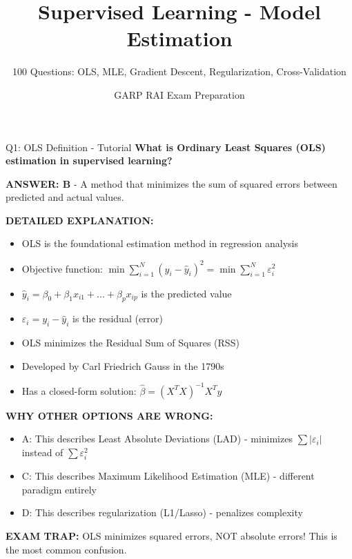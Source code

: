 \documentclass[8pt]{beamer}
\title{Supervised Learning - Model Estimation}
\subtitle{100 Questions: OLS, MLE, Gradient Descent, Regularization, Cross-Validation}
\author{GARP RAI Exam Preparation}
\date{}
\begin{document}
	
	\begin{frame}
		\titlepage
	\end{frame}
	
	
	\begin{frame}{Q1: OLS Definition - Tutorial}
		\fontsize{6.5}{7.5}\selectfont
		\textbf{What is Ordinary Least Squares (OLS) estimation in supervised learning?}
		
		\vspace{0.05cm}
		\textcolor{myblue}{\textbf{ANSWER: B}} - A method that minimizes the sum of squared errors between predicted and actual values.
		
		\vspace{0.05cm}
		\textbf{DETAILED EXPLANATION:}
		\begin{itemize}
			\item OLS is the foundational estimation method in regression analysis
			\item Objective function: $\min \sum_{i=1}^N (y_i - \hat{y}_i)^2 = \min \sum_{i=1}^N \varepsilon_i^2$
			\item $\hat{y}_i = \beta_0 + \beta_1 x_{i1} + ... + \beta_p x_{ip}$ is the predicted value
			\item $\varepsilon_i = y_i - \hat{y}_i$ is the residual (error)
			\item OLS minimizes the Residual Sum of Squares (RSS)
			\item Developed by Carl Friedrich Gauss in the 1790s
			\item Has a closed-form solution: $\hat{\beta} = (X^TX)^{-1}X^Ty$
		\end{itemize}
		
		\vspace{0.05cm}
		\textcolor{myred}{\textbf{WHY OTHER OPTIONS ARE WRONG:}}
		\begin{itemize}
			\item \textcolor{myred}{A:} This describes Least Absolute Deviations (LAD) - minimizes $\sum |\varepsilon_i|$ instead of $\sum \varepsilon_i^2$
			\item \textcolor{myred}{C:} This describes Maximum Likelihood Estimation (MLE) - different paradigm entirely
			\item \textcolor{myred}{D:} This describes regularization (L1/Lasso) - penalizes complexity
		\end{itemize}
		
		\textcolor{myred}{\textbf{EXAM TRAP:}} OLS minimizes \textcolor{myblue}{squared errors}, NOT absolute errors! This is the most common confusion.
	\end{frame}
	
\end{document}

